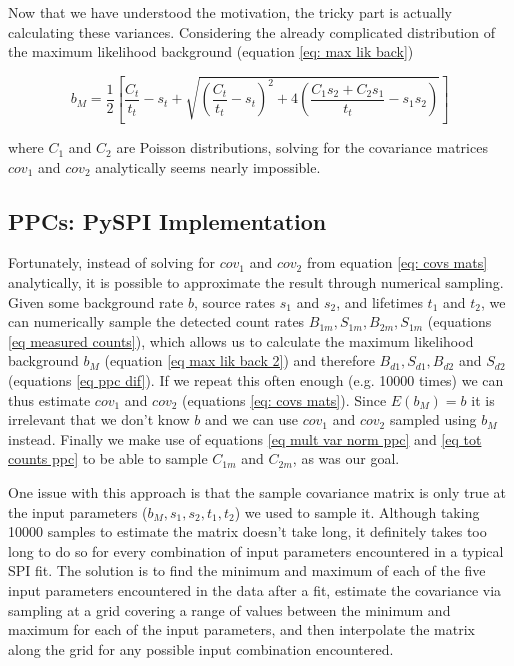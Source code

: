 \documentclass{report}
\begin{document}
Now that we have understood the motivation, the tricky part is actually calculating these variances. Considering the already complicated distribution of the maximum likelihood background (equation \ref{eq: max lik back})

\begin{equation}\label{eq max lik back 2}
  b_M = \frac{1}{2} \left[ \frac{C_t}{t_t} - s_t + \sqrt{\left( \frac{C_t}{t_t} - s_t\right)^2 + 4 \left( \frac{C_1s_2+C_2s_1}{t_t}-s_1s_2\right)}\right]
\end{equation}

where $C_1$ and $C_2$ are Poisson distributions, solving for the covariance matrices $cov_1$ and $cov_2$ analytically seems nearly impossible.


\subsection{PPCs: PySPI Implementation}

Fortunately, instead of solving for $cov_1$ and $cov_2$ from equation \ref{eq: covs mats} analytically, it is possible to approximate the result through numerical sampling. Given some background rate $b$, source rates $s_1$ and $s_2$, and lifetimes $t_1$ and $t_2$, we can numerically sample the detected count rates $B_{1m}, S_{1m}, B_{2m}, S_{1m}$ (equations \ref{eq measured counts}), which allows us to calculate the maximum likelihood background $b_M$ (equation \ref{eq max lik back 2}) and therefore $B_{d1},S_{d1},B_{d2}$ and $S_{d2}$ (equations \ref{eq ppc dif}). If we repeat this often enough (e.g. 10000 times) we can thus estimate $cov_1$ and $cov_2$ (equations \ref{eq: covs mats}). Since $E(b_M) = b$ it is irrelevant that we don't know $b$ and we can use $cov_1$ and $cov_2$ sampled using $b_M$ instead. Finally we make use of equations \ref{eq mult var norm ppc} and \ref{eq tot counts ppc} to be able to sample $C_{1m}$ and $C_{2m}$, as was our goal.

One issue with this approach is that the sample covariance matrix is only true at the input parameters ($b_M,s_1,s_2,t_1,t_2$) we used to sample it. Although taking 10000 samples to estimate the matrix doesn't take long, it definitely takes too long to do so for every combination of input parameters encountered in a typical SPI fit. The solution is to find the minimum and maximum of each of the five input parameters encountered in the data after a fit, estimate the covariance via sampling at a grid covering a range of values between the minimum and maximum for each of the input parameters, and then interpolate the matrix along the grid for any possible input combination encountered. 
\end{document}

